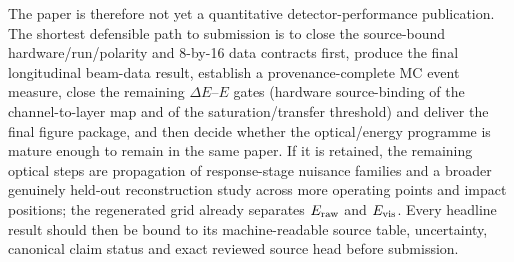 The paper is therefore not yet a quantitative detector-performance publication. The shortest defensible path to submission is to close the source-bound hardware/run/polarity and 8-by-16 data contracts first, produce the final longitudinal beam-data result, establish a provenance-complete MC event measure, close the remaining \(\Delta E\)--\(E\) gates (hardware source-binding of the channel-to-layer map and of the saturation/transfer threshold) and deliver the final figure package, and then decide whether the optical/energy programme is mature enough to remain in the same paper. If it is retained, the remaining optical steps are propagation of response-stage nuisance families and a broader genuinely held-out reconstruction study across more operating points and impact positions; the regenerated grid already separates \(E_{\rm raw}\) and \(E_{\rm vis}\). Every headline result should then be bound to its machine-readable source table, uncertainty, canonical claim status and exact reviewed source head before submission.
